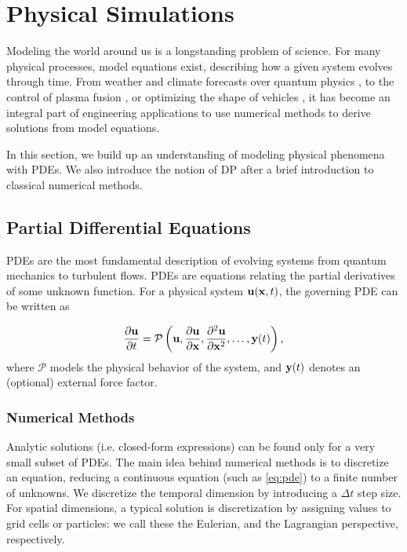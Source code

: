 \chapter{Physical Simulations}\label{chapter:physical-simulations}
Modeling the world around us is a longstanding problem of science. For many
physical processes, model equations exist, describing how a given system evolves
through time. From weather and climate forecasts \cite{stocker2014climate}
over quantum physics \cite{QuantumSim}, to the control of plasma fusion
\cite{PlasmaControl}, or optimizing the shape of
vehicles \cite{OptimizationCFD}, it has become an integral part of engineering
applications to use numerical methods to derive solutions from model equations.

In this section, we build up an understanding of modeling physical phenomena
with \acfp{PDE}. We also introduce the notion of \acf{DP} after a brief
introduction to classical numerical methods.

\section{Partial Differential Equations}
\acp{PDE} are the most fundamental description of evolving systems from quantum
mechanics to turbulent flows. \acp{PDE} are equations relating the partial
derivatives of some unknown function. For a physical system $\vb{u}(\vb{x},t)$,
the governing \ac{PDE} can be written as

\begin{equation}
\label{eq:pde}
\pdv{\vb{u}}{t} = \mathcal{P}\left(\vb{u}, \pdv{\vb{u}}{\vb{x}},
\pdv[2]{\vb{u}}{\vb{x}},\dots,\vb{y}(t)\right),
\end{equation}
where $\mathcal{P}$ models the physical behavior of the system, and $\vb{y}(t)$
denotes an (optional) external force factor. 

\subsection{Numerical Methods}
Analytic solutions (i.e. closed-form expressions) can be found only for a very
small subset of \acfp{PDE}. The main idea behind numerical methods is to
discretize an equation, reducing a continuous equation (such as \ref{eq:pde}) to
a finite number of unknowns. We discretize the temporal dimension by introducing
a $\Delta t$ step size. For spatial dimensions, a typical solution is
discretization by assigning values to grid cells or particles: we call these the
Eulerian, and the Lagrangian perspective, respectively.

